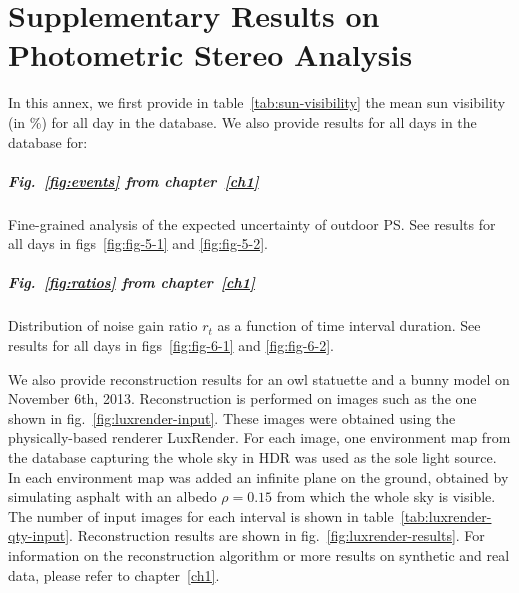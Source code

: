 \chapter{Supplementary Results on Photometric Stereo Analysis}     %
\label{annex1}

\graphicspath{{annex1_figures/}}


In this annex, we first provide in table~\ref{tab:sun-visibility} the mean sun visibility (in \%) for all day in the database. We also provide results for all days in the database for: 
\vspace{-.5em}
\paragraph{Fig.~\ref{fig:events} from chapter~\ref{ch1}} Fine-grained analysis of the expected uncertainty of outdoor PS. See results for all days in figs~\ref{fig:fig-5-1} and \ref{fig:fig-5-2}.


\paragraph{Fig.~\ref{fig:ratios} from chapter~\ref{ch1}} Distribution of noise gain ratio $r_t$ as a function of time interval duration. See results for all days in figs~\ref{fig:fig-6-1} and \ref{fig:fig-6-2}.

\vspace{1em}

We also provide reconstruction results for an owl statuette and a bunny model on November 6th, 2013. Reconstruction is performed on images such as the one shown in fig.~\ref{fig:luxrender-input}. These images were obtained using the physically-based renderer LuxRender. For each image, one environment map from the database capturing the whole sky in HDR was used as the sole light source. In each environment map was added an infinite plane on the ground, obtained by simulating asphalt with an albedo $\rho = 0.15$ from which the whole sky is visible. The number of input images for each interval is shown in table~\ref{tab:luxrender-qty-input}. Reconstruction results are shown in fig.~\ref{fig:luxrender-results}. For information on the reconstruction algorithm or more results on synthetic and real data, please refer to chapter~\ref{ch1}.


